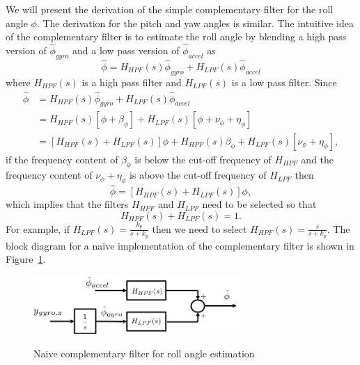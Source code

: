 We will present the derivation of the simple complementary filter for the roll angle $\phi$.  The derivation for the pitch and yaw angles is similar. 
The intuitive idea of the complementary filter is to estimate the roll angle by blending a high pass version of $\hat{\phi}_{gyro}$ and a low pass version of $\hat{\phi}_{accel}$ as 
$$
\hat{\phi} = H_{\mathit{HPF}}(s) \hat{\phi}_{gyro} + H_{\mathit{LPF}}(s) \hat{\phi}_{accel}
$$
where $H_{\mathit{HPF}}(s)$ is a high pass filter and $H_{\mathit{LPF}}(s)$ is a low pass filter.  Since
\begin{align*}
\hat{\phi} &= H_{\mathit{HPF}}(s) \hat{\phi}_{gyro} + H_{\mathit{LPF}}(s) \hat{\phi}_{accel} \\
&= H_{\mathit{HPF}}(s) \left[\phi + \beta_\phi \right] + H_{\mathit{LPF}}(s) \left[\phi + \nu_\phi + \eta_{\phi}\right] \\
&= \left[ H_{\mathit{HPF}}(s) + H_{\mathit{LPF}}(s) \right] \phi + H_{\mathit{HPF}}(s) \beta_\phi + H_{\mathit{LPF}}(s) \left[\nu_\phi + \eta_\phi\right],
\end{align*}
if the frequency content of $\beta_\phi$ is below the cut-off frequency of $H_{\mathit{HPF}}$ and the frequency content of $\nu_\phi+\eta_\phi$ is above the cut-off frequency of $H_{\mathit{LPF}}$ then
\[
\hat{\phi}= \left[ H_{\mathit{HPF}}(s) + H_{\mathit{LPF}}(s) \right] \phi,
\]
which implies that the filters $H_{\mathit{HPF}}$ and $H_{\mathit{LPF}}$ need to be selected so that
$$
H_{\mathit{HPF}}(s) + H_{\mathit{LPF}}(s) = 1.
$$
For example, if $H_{\mathit{LPF}}(s) = \frac{k_p}{s+k_p}$ then we need to select $H_{\mathit{HPF}}(s) = \frac{s}{s+k_p}$.  The block diagram for a naive implementation of the complementary filter is shown in Figure~\ref{fig:complementary_filter_naive}.
\begin{figure}[hhhhtb]
  \centering
  \includegraphics[width=0.7\textwidth]{chap11_attitude_estimation/figures/complementary_filter_naive}\\
  \caption{Naive complementary filter for roll angle estimation}%
  \label{fig:complementary_filter_naive}
\end{figure}

